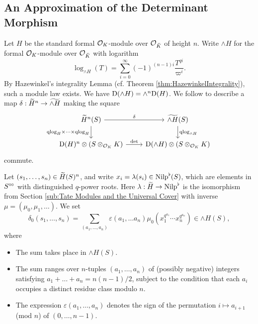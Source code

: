 \documentclass[../main.tex]{subfiles}
\begin{document}
\subsection{An Approximation of the Determinant Morphism} %
\label{sub:Determinants}
Let $H$ be the standard formal $\cO_K$-module over $\cO_{\breve K}$ of height
$n$. Write $\wedge H$ for the formal $\cO_K$-module over $\cO_{\breve K}$ with
logarithm
\begin{equation*}
  \log_{\wedge H}(T) = \sum_{i = 0}^\infty (-1)^{(n-1)i} \frac{T^{qi}}{\varpi^i}.
\end{equation*}
By Hazewinkel's integrality Lemma (cf. Theorem \ref{thm:HazewinkelIntegrality}), 
such a module law exists. We have $\Dio(\wedge H) = \wedge^n \Dio(H)$. 
We follow \cite[Theorem 2.10.3]{BoyarchenkoWeinstein2011MaxVar} to describe a map $\delta:
\Tilde H^n \to \Tilde {\wedge H}$ making the square
\begin{equation}\label{diag:qlogsquare}
\begin{tikzcd}[ampersand replacement=\&]
	{\Tilde H^n(S)} \& {\Tilde{\wedge H}(S)} \\
	{\Dio(H)^n \otimes (S\otimes_{\cO_K} K)} \& {\Dio(\wedge H) \otimes(S\otimes_{\cO_K}K)}
	\arrow["\delta", from=1-1, to=1-2]
	\arrow["\qlog_H \times \dots \times \qlog_H"', from=1-1, to=2-1]
  \arrow["\qlog_{\wedge H}", from=1-2, to=2-2]
	\arrow["\det", from=2-1, to=2-2]
\end{tikzcd}
\end{equation}
commute. 

Let $(s_1, \dots, s_n) \in \Tilde H(S)^n$, and write $x_i = \lambda(s_i) \in
\Nilp^\flat(S)$, which are elements in $S^\cici$ with distinguished $q$-power
roots. Here $\lambda: \Tilde H \to \Nilp^\flat$ is the isomorphism from Section
\ref{sub:Tate Modules and the Universal Cover} with inverse $\mu = (\mu_0,
\mu_1, \dots)$. 
We set
\begin{equation*}
  \delta_0(s_1, \dots, s_n) = \sum_{(a_1, \dots, a_n)} \varepsilon(a_1, \dots
  a_n) \mu_0(x_1^{q^{a_1}} \cdots x_n^{q^{a_n}}) \in \wedge H(S),
\end{equation*}
where 
\begin{itemize}
  \item The sum takes place in ${\wedge H}(S)$.
  \item The sum ranges over $n$-tuples $(a_1, \dots, a_n)$ of (possibly negative) integers 
    satisfying $a_1 + \dots + a_n = n (n-1)/2$, subject to the
    condition that each $a_i$ occupies a distinct residue class modulo $n$.
  \item The expression $\varepsilon(a_1, \dots, a_n)$ denotes the sign of the 
    permutation $i \mapsto a_{i+1}$ (mod $n$) of $(0, \dots, n-1)$.
\end{itemize}
\end{document}
